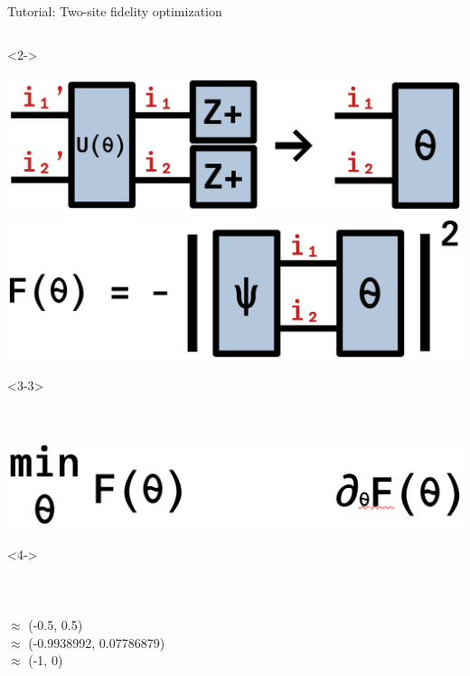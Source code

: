 \begin{frame}[fragile]{Tutorial: Two-site fidelity optimization}
\begin{columns}
\begin{column}{5cm}
\begin{onlyenv}<2->
\vspace*{0.0cm}
\begin{center}
\includegraphics[width=1.0\textwidth]{
  slides/assets/UZp1Zp2.png
} \\
\includegraphics[width=1.0\textwidth]{
  slides/assets/psi12theta12.png
}
\end{center}
\vspace*{0.0cm}
\end{onlyenv}

\begin{onlyenv}<3-3>
\vspace*{0.0cm}
~\\
~\\
~\\
\begin{center}
\includegraphics[width=1.0\textwidth]{
  slides/assets/min_grad_F_theta.png
}
\end{center}
\vspace*{0.0cm}
\end{onlyenv}

\begin{onlyenv}<4->
~\\
~\\
~\\
~\\
$\approx$ (-0.5, 0.5) \\
$\approx$ (-0.9938992, 0.07786879) \\
    $\approx$ (-1, 0)
\end{onlyenv}

\end{column}

\end{columns}

\end{frame}
